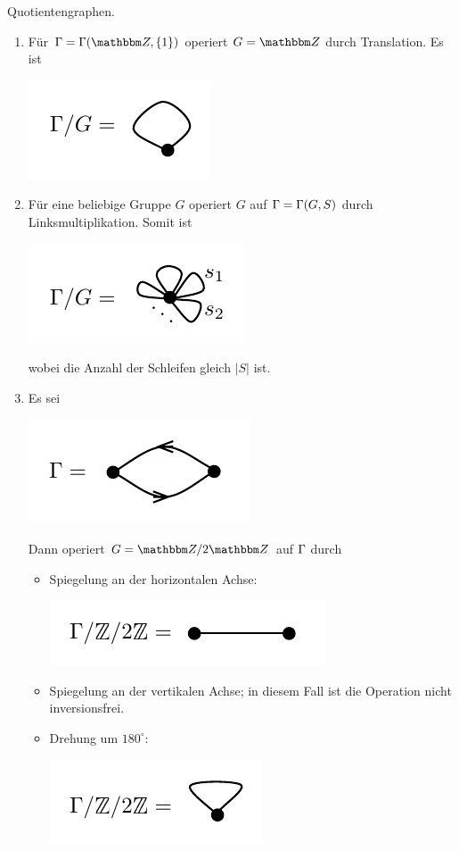 \documentclass[a4paper, 12pt, twoside]{article}
\begin{document}
\BSP Quotientengraphen.
\begin{enumerate}
\item Für $\GR=\GR(\ZZ,\{1\})$ operiert $G=\ZZ$ durch
Translation. Es ist
\begin{center}
	\includegraphics{grugraImages/quot1}
\end{center}
\item Für eine beliebige Gruppe $G$ operiert $G$ auf
$\Gamma=\Gamma(G,S)$ durch Linksmultiplikation.
Somit ist
\begin{center}
	\includegraphics{grugraImages/quot2}
\end{center}
wobei die Anzahl der Schleifen gleich $|S|$ ist.
\item Es sei
\begin{center}
	\includegraphics{grugraImages/quot3}
\end{center}
Dann operiert $G=\ZZ/2\ZZ$ auf $\Gamma$ durch
\begin{itemize}
\item Spiegelung an der horizontalen Achse:
\begin{center}
	\includegraphics{grugraImages/quot3a}
\end{center}
\item Spiegelung an der vertikalen Achse; in diesem Fall ist
die Operation nicht inversionsfrei.
\item
Drehung um $180^\circ$:
\begin{center}
	\includegraphics{grugraImages/quot3b}
\end{center}
\end{itemize}
\end{enumerate}
\end{document}
